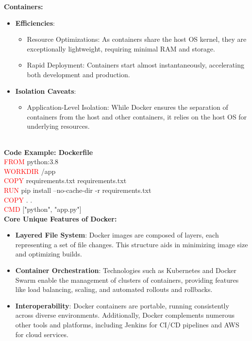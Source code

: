 \documentclass{article}
\begin{document}
\textbf{Containers:}
\begin{itemize}
\color{blue}
\item \textbf{Efficiencies}: 
\begin{itemize}
    \item Resource Optimizations: As containers share the host OS kernel, they are exceptionally lightweight, requiring minimal RAM and storage.
    \item Rapid Deployment: Containers start almost instantaneously, accelerating both development and production.
\end{itemize}
\item \textbf{Isolation Caveats}: 
\begin{itemize}
    \item Application-Level Isolation: While Docker ensures the separation of containers from the host and other containers, it relies on the host OS for underlying resources.
\end{itemize}
\end{itemize}
\\
\textbf{Code Example: Dockerfile} \\
\textcolor{red}{FROM} python:3.8 \\
\textcolor{red}{WORKDIR} /app\\
\textcolor{red}{COPY} requirements.txt requirements.txt\\
\textcolor{red}{RUN} pip install --no-cache-dir -r requirements.txt\\
\textcolor{red}{COPY} . .\\
\textcolor{red}{CMD} ["python", "app.py"] 
\\ 
\textbf{Core Unique Features of Docker:} \\
\begin{itemize}
\color{blue}
\item \textbf{Layered File System}: Docker images are composed of layers, each representing a set of file changes. This structure aids in minimizing image size and optimizing builds.
\item \textbf{Container Orchestration}: Technologies such as Kubernetes and Docker Swarm enable the management of clusters of containers, providing features like load balancing, scaling, and automated rollouts and rollbacks.
\item \textbf{Interoperability}: Docker containers are portable, running consistently across diverse environments. Additionally, Docker complements numerous other tools and platforms, including Jenkins for CI/CD pipelines and AWS for cloud services. 
\end{itemize}
\end{document}
